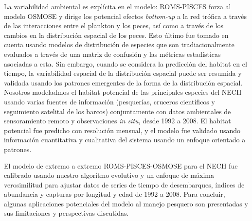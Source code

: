 La variabilidad ambiental es explícita en el modelo: ROMS-PISCES forza al modelo OSMOSE y dirige los potencial efectos \emph{bottom-up} a la red trófica a través de las interacciones entre el plankton y los peces, así como a través de los cambios en la distribución espacial de los peces. Esto último fue tomado en cuenta usando modelos de distribución de especies que son tradiacionalmente evaluados a través de una matriz de confusión y las métricas estadísticas asociadas a esta. Sin embargo, cuando se considera la predicción del habitat en el tiempo, la variabilidad espacial de la distribución espacial puede ser resumida y validada usando los patrones emergentes de la forma de la distribución espacial. Nosotros modeladmos el habitat potencial de las principales especies del NECH usando varias fuentes de información (pesquerías, cruceros científicos y seguimiento satelital de los barcos) conjuntamente con datos ambientales de sensoramiento remoto y observaciones \emph{in situ}, desde 1992 a 2008. El habitat potencial fue predicho con resolución mensual, y el modelo fue validado usando información cuantitativa y cualitativa del sistema usando un enfoque orientado a patrones. 

El modelo de extremo a extremo ROMS-PISCES-OSMOSE para el NECH fue calibrado usando nuestro algoritmo evolutivo y un enfoque de máxima verosimilitud para ajustar datos de series de tiempo de desembarques, índices de abundancia y capturas por longitud y edad de 1992 a 2008. Para concluir, algunas aplicaciones potenciales del modelo al manejo pesquero son presentadas y sus limitaciones y perspectivas discutidas. 


